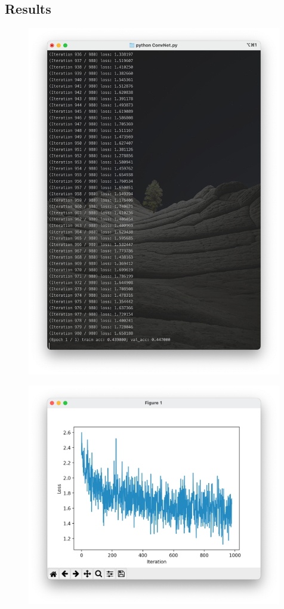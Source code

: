 \documentclass[a4paper, 11pt]{article}
\begin{document}
\subsection{Results}
\begin{figure}[htb]
  \centering
  \includegraphics[width=0.99\textwidth]{pic/1.png}
  \qquad
\end{figure}
\begin{figure}[htb]
  \centering
  \includegraphics[width=0.99\textwidth]{pic/2.png}
  \qquad
\end{figure}



%
%
\end{document}
